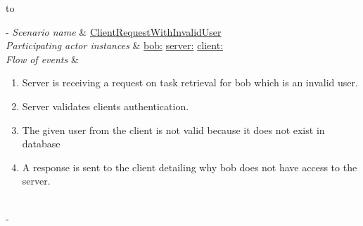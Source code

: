 \begin{table}[h!]

	\tabulinesep=1.5mm
	
	\begin{tabu} to 
	
		\tabucline[1.5pt]-
		\textit{Scenario name} & \underline{ClientRequestWithInvalidUser} \\
		\hline
		\textit{Participating actor \newline instances} & 
		\underline{bob:\invalidUser}
		\newline \underline{server:\serverside}
		\newline \underline{client:\clientside} \\
		\hline
		\textit{Flow of events} &
		\vspace{-3mm}
		
		\begin{enumerate}[leftmargin=*,topsep=0pt,itemsep=-1ex]
		
			\item Server is receiving a request on task retrieval for bob which is an invalid user.
			
			\item Server validates clients authentication. 
			
			\item The given user from the client is not valid because it does not exist in database
			
			\item A response is sent to the client detailing why bob does not have access to the server. \\
			
		\end{enumerate} \\
		\tabucline[1.5pt]-
		
	\end{tabu}
	\caption{Scenario when a invalid user is trying to get access to the server.}
	\label{sc:ClientRequestWithInvalidUser}
	
\end{table}

